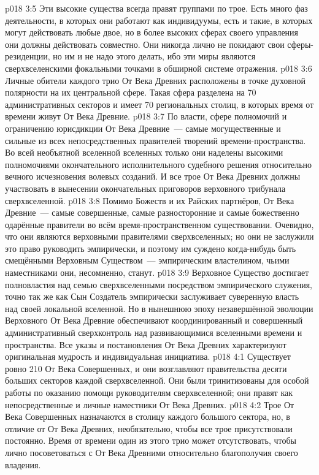 \vs p018 3:5 \pc Эти высокие существа всегда правят группами по трое. Есть много фаз деятельности, в которых они работают как индивидуумы, есть и такие, в которых могут действовать любые двое, но в более высоких сферах своего управления они должны действовать совместно. Они никогда лично не покидают свои сферы\hyp{}резиденции, но им и не надо этого делать, ибо эти миры являются сверхвселенскими фокальными точками в обширной системе отражения.
\vs p018 3:6 Личные обители каждого трио От Века Древних расположены в точке духовной полярности на их центральной сфере. Такая сфера разделена на 70 административных секторов и имеет 70 региональных столиц, в которых время от времени живут От Века Древние.
\vs p018 3:7 По власти, сфере полномочий и ограничению юрисдикции От Века Древние~--- самые могущественные и сильные из всех непосредственных правителей творений времени\hyp{}пространства. Во всей необъятной вселенной вселенных только они наделены высокими полномочиями окончательного исполнительного судебного решения относительно вечного исчезновения волевых созданий. И все трое От Века Древних должны участвовать в вынесении окончательных приговоров верховного трибунала сверхвселенной.
\vs p018 3:8 \pc Помимо Божеств и их Райских партнёров, От Века Древние~--- самые совершенные, самые разносторонние и самые божественно одарённые правители во всём время\hyp{}пространственном существовании. Очевидно, что они являются верховными правителями сверхвселенных; но они не заслужили это право руководить эмпирически, и поэтому им суждено когда\hyp{}нибудь быть смещёнными Верховным Существом~--- эмпирическим властелином, чьими наместниками они, несомненно, станут.
\vs p018 3:9 Верховное Существо достигает полновластия над семью сверхвселенными посредством эмпирического служения, точно так же как Сын Создатель эмпирически заслуживает суверенную власть над своей локальной вселенной. Но в нынешнюю эпоху незавершённой эволюции Верховного От Века Древние обеспечивают координированный и совершенный административный сверхконтроль над развивающимися вселенными времени и пространства. Все указы и постановления От Века Древних характеризуют оригинальная мудрость и индивидуальная инициатива.
\vs p018 4:1 Существует ровно 210 От Века Совершенных, и они возглавляют правительства десяти больших секторов каждой сверхвселенной. Они были тринитизованы для особой работы по оказанию помощи руководителям сверхвселенной; они правят как непосредственные и личные наместники От Века Древних.
\vs p018 4:2 Трое От Века Совершенных назначаются в столицу каждого большого сектора, но, в отличие от От Века Древних, необязательно, чтобы все трое присутствовали постоянно. Время от времени один из этого трио может отсутствовать, чтобы лично посоветоваться с От Века Древними относительно благополучия своего владения.
